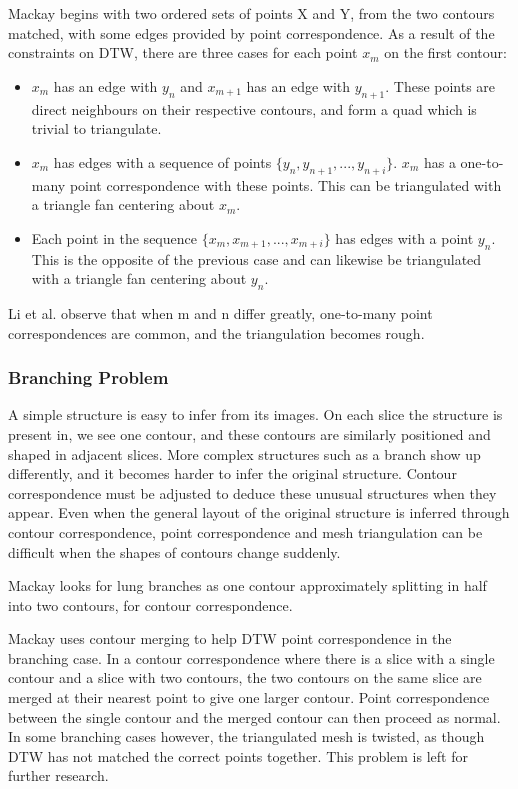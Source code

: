 \documentclass[11p, titlepage]{article}
\begin{document}
Mackay \cite{mackay2019robust} begins with two ordered sets of points X and Y, from the two contours matched, with some edges provided by point correspondence. As a result of the constraints on DTW, there are three cases for each point $x_{m}$ on the first contour:
\begin{itemize}
\item $x_{m}$ has an edge with $y_{n}$ and $x_{m+1}$ has an edge with $y_{n+1}$. These points are direct neighbours on their respective contours, and form a quad which is trivial to triangulate.
\item $x_{m}$ has edges with a sequence of points $\{y_{n}, y_{n+1}, ..., y_{n+i}\}$. $x_{m}$ has a one-to-many point correspondence with these points. This can be triangulated with a triangle fan centering about $x_{m}$.
\item Each point in the sequence $\{x_{m}, x_{m+1}, ..., x_{m+i}\}$ has edges with a point $y_{n}$. This is the opposite of the previous case and can likewise be triangulated with a triangle fan centering about $y_{n}$.
\end{itemize}
Li et al. \cite{li2021method} observe that when m and n differ greatly, one-to-many point correspondences are common, and the triangulation becomes rough.

\subsubsection{Branching Problem}

A simple structure is easy to infer from its images. On each slice the structure is present in, we see one contour, and these contours are similarly positioned and shaped in adjacent slices. More complex structures such as a branch show up differently, and it becomes harder to infer the original structure. Contour correspondence must be adjusted to deduce these unusual structures when they appear. Even when the general layout of the original structure is inferred through contour correspondence, point correspondence and mesh triangulation can be difficult when the shapes of contours change suddenly.

Mackay \cite{mackay2019robust} looks for lung branches as one contour approximately splitting in half into two contours, for contour correspondence.

Mackay \cite{mackay2019robust} uses contour merging to help DTW point correspondence in the branching case. In a contour correspondence where there is a slice with a single contour and a slice with two contours, the two contours on the same slice are merged at their nearest point to give one larger contour. Point correspondence between the single contour and the merged contour can then proceed as normal. In some branching cases however, the triangulated mesh is twisted, as though DTW has not matched the correct points together. This problem is left for further research.
\end{document}
